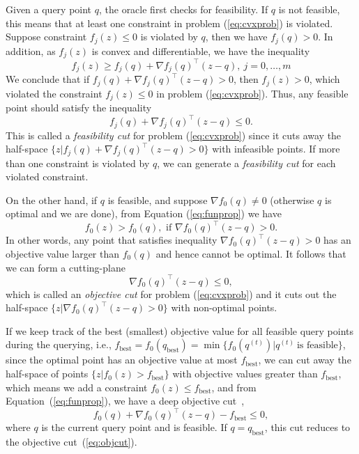 Given a query point $q$, the oracle first checks for feasibility.
If $q$ is not feasible, this means that at least one constraint in problem (\ref{eq:cvxprob}) is violated.
Suppose constraint $f_j(z) \le 0$ is violated by $q$, then we have $f_j(q) > 0$.
In addition, as $f_j(z)$ is convex and differentiable, we have the inequality
\begin{equation}
\label{eq:funprop}
f_j(z) \ge f_j(q) + \nabla f_j(q)^\top (z - q),~ j = 0, \dots, m
\end{equation}
We conclude that if $f_j(q) + \nabla f_j(q)^\top (z - q) > 0$, then $f_j(z) > 0$, 
which violated the constraint $f_j(z) \le 0$ in problem (\ref{eq:cvxprob}).
Thus, any feasible point should satisfy the inequality
\begin{equation}
\label{eq:feacut}
f_j(q) + \nabla f_j(q)^\top (z - q) \le 0.
\end{equation}
This is called a \textit{feasibility cut} for problem (\ref{eq:cvxprob}) since it cuts away the half-space 
$\{z | f_j(q) + \nabla f_j(q)^\top (z - q) > 0 \}$ with infeasible points.
If more than one constraint is violated by $q$, we can generate a \emph{feasibility cut} for each violated constraint.

On the other hand, if $q$ is feasible, and suppose $\nabla f_0(q) \ne 0$ (otherwise $q$ is optimal and we are done),
from Equation (\ref{eq:funprop}) we have
\begin{equation*}
f_0(z) > f_0(q), \text{~if~} \nabla f_0(q)^\top (z - q) > 0.
\end{equation*}
In other words, any point that satisfies inequality $\nabla f_0(q)^\top (z - q) > 0$ has an objective value larger than $f_0(q)$ 
and hence cannot be optimal.
It follows that we can form a cutting-plane
\begin{equation}
\label{eq:objcut}
\nabla f_0(q)^\top (z - q) \le 0,
\end{equation}
which is called an \textit{objective cut} for problem (\ref{eq:cvxprob}) and 
it cuts out the half-space $\{z | \nabla f_0(q)^\top (z - q) > 0 \}$ with non-optimal points.

If we keep track of the best (smallest) objective value for all feasible query points during the querying, i.e.,
$f_\text{best} = f_0(q_\text{best}) = \min\{f_0(q^{(t)}) | q^{(t)} ~\text{is feasible}\}$,
since the optimal point has an objective value at most $f_\text{best}$, 
we can cut away the half-space of points $\{z | f_0(z) > f_\text{best} \}$ with objective values greater than $f_\text{best}$, 
which means we add a constraint $f_0(z) \le f_\text{best}$, and from Equation~(\ref{eq:funprop}), 
we have a deep objective cut~\cite{boydlocalization},
\begin{equation}
\label{eq:deepobjcut}
f_0(q) + \nabla f_0(q)^\top (z - q) - f_\text{best} \le 0,
\end{equation}
where $q$ is the current query point and is feasible. If $q = q_\text{best}$, this cut reduces to the objective cut~(\ref{eq:objcut}).

